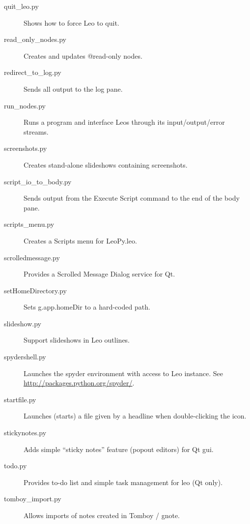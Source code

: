 \documentclass[a4paper,10pt,english]{sphinxmanual}
\begin{document}
\begin{description}
\item[{quit\_leo.py}] \leavevmode
Shows how to force Leo to quit.

\item[{read\_only\_nodes.py}] \leavevmode
Creates and updates @read-only nodes.

\item[{redirect\_to\_log.py}] \leavevmode
Sends all output to the log pane.

\item[{run\_nodes.py}] \leavevmode
Runs a program and interface Leos through its input/output/error streams.

\item[{screenshots.py}] \leavevmode
Creates stand-alone slideshows containing screenshots.

\item[{script\_io\_to\_body.py}] \leavevmode
Sends output from the Execute Script command to the end of the body pane.

\item[{scripts\_menu.py}] \leavevmode
Creates a Scripts menu for LeoPy.leo.

\item[{scrolledmessage.py}] \leavevmode
Provides a Scrolled Message Dialog service for Qt.

\item[{setHomeDirectory.py}] \leavevmode
Sets g.app.homeDir to a hard-coded path.

\item[{slideshow.py}] \leavevmode
Support slideshows in Leo outlines.

\item[{spydershell.py}] \leavevmode
Launches the spyder environment with access to Leo instance.
See \href{http://packages.python.org/spyder/}{http://packages.python.org/spyder/}.

\item[{startfile.py}] \leavevmode
Launches (starts) a file given by a headline when double-clicking the icon.

\item[{stickynotes.py}] \leavevmode
Adds simple ``sticky notes'' feature (popout editors) for Qt gui.

\item[{todo.py}] \leavevmode
Provides to-do list and simple task management for leo (Qt only).

\item[{tomboy\_import.py}] \leavevmode
Allows imports of notes created in Tomboy / gnote.


\end{description}
\end{document}
